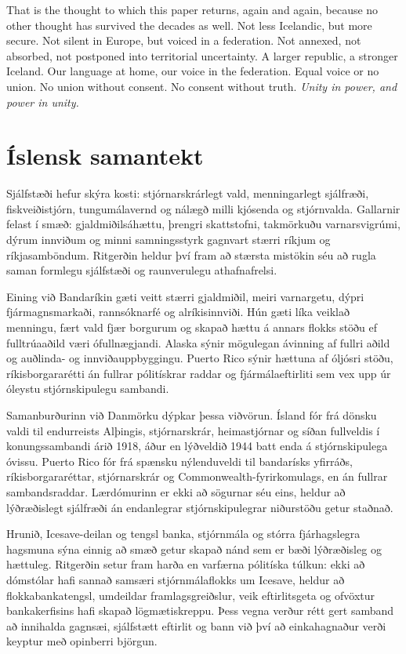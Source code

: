 \documentclass[11pt,a4paper]{article}
\newcommand{\MottoEN}{Unity in power, and power in unity}
\begin{document}
That is the thought to which this paper returns, again and again, because no other thought has survived the decades as well. Not less Icelandic, but more secure. Not silent in Europe, but voiced in a federation. Not annexed, not absorbed, not postponed into territorial uncertainty. A larger republic, a stronger Iceland. Our language at home, our voice in the federation. Equal voice or no union. No union without consent. No consent without truth. \textit{\MottoEN.}

\section*{Íslensk samantekt}
Sjálfstæði hefur skýra kosti: stjórnarskrárlegt vald, menningarlegt sjálfræði, fiskveiðistjórn, tungumálavernd og nálægð milli kjósenda og stjórnvalda. Gallarnir felast í smæð: gjaldmiðilsáhættu, þrengri skattstofni, takmörkuðu varnarsvigrúmi, dýrum innviðum og minni samningsstyrk gagnvart stærri ríkjum og ríkjasamböndum. Ritgerðin heldur því fram að stærsta mistökin séu að rugla saman formlegu sjálfstæði og raunverulegu athafnafrelsi.

Eining við Bandaríkin gæti veitt stærri gjaldmiðil, meiri varnargetu, dýpri fjármagnsmarkaði, rannsóknarfé og alríkisinnviði. Hún gæti líka veiklað menningu, fært vald fjær borgurum og skapað hættu á annars flokks stöðu ef fulltrúaaðild væri ófullnægjandi. Alaska sýnir mögulegan ávinning af fullri aðild og auðlinda- og innviðauppbyggingu. Puerto Rico sýnir hættuna af óljósri stöðu, ríkisborgararétti án fullrar pólitískrar raddar og fjármálaeftirliti sem vex upp úr óleystu stjórnskipulegu sambandi.

Samanburðurinn við Danmörku dýpkar þessa viðvörun. Ísland fór frá dönsku valdi til endurreists Alþingis, stjórnarskrár, heimastjórnar og síðan fullveldis í konungssambandi árið 1918, áður en lýðveldið 1944 batt enda á stjórnskipulega óvissu. Puerto Rico fór frá spænsku nýlenduveldi til bandarísks yfirráðs, ríkisborgararéttar, stjórnarskrár og Commonwealth-fyrirkomulags, en án fullrar sambandsraddar. Lærdómurinn er ekki að sögurnar séu eins, heldur að lýðræðislegt sjálfræði án endanlegrar stjórnskipulegrar niðurstöðu getur staðnað.

Hrunið, Icesave-deilan og tengsl banka, stjórnmála og stórra fjárhagslegra hagsmuna sýna einnig að smæð getur skapað nánd sem er bæði lýðræðisleg og hættuleg. Ritgerðin setur fram harða en varfærna pólitíska túlkun: ekki að dómstólar hafi sannað samsæri stjórnmálaflokks um Icesave, heldur að flokkabankatengsl, umdeildar framlagsgreiðslur, veik eftirlitsgeta og ofvöxtur bankakerfisins hafi skapað lögmætiskreppu. Þess vegna verður rétt gert samband að innihalda gagnsæi, sjálfstætt eftirlit og bann við því að einkahagnaður verði keyptur með opinberri björgun.
\end{document}
